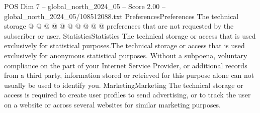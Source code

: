 \begin{textsample}{POS Dim 7 – global\_north\_2024\_05 – Score 2.00 – global\_north\_2024\_05/108512088.txt}
PreferencesPreferences The technical storage @ @ @ @ @ @ @ @ @ @ preferences that are not requested by the subscriber or user.
StatisticsStatistics The technical storage or access that is used exclusively for statistical purposes.The technical storage or access that is used exclusively for anonymous statistical purposes.
Without a subpoena, voluntary compliance on the part of your Internet Service Provider, or additional records from a third party, information stored or retrieved for this purpose alone can not usually be used to identify you.
MarketingMarketing The technical storage or access is required to create user profiles to send advertising, or to track the user on a website or across several websites for similar marketing purposes.

\end{textsample}
